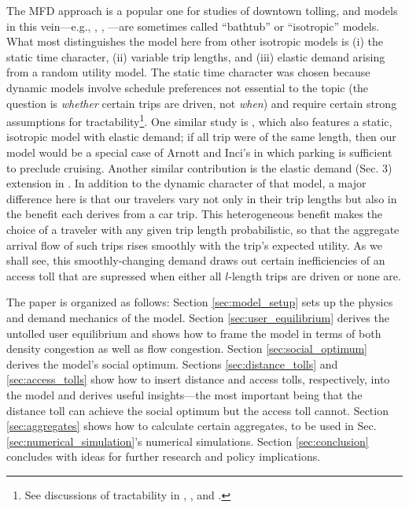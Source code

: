 \documentclass[preprint,authoryear]{elsarticle}
\begin{document}
The MFD approach is a popular one for studies of downtown tolling, and models in this vein---e.g., \citet{SmallChu2003}, \citet{Arnott2013}, \citet{Geroliminis2009a}---are sometimes called ``bathtub'' or ``isotropic'' models. What most distinguishes the model here from other isotropic models is (i) the static time character, (ii) variable trip lengths, and (iii) elastic demand arising from a random utility model. The static time character was chosen because dynamic models involve schedule preferences not essential to the topic (the question is \emph{whether} certain trips are driven, not \emph{when}) and require certain strong assumptions for tractability\footnote{See discussions of tractability in \citet{Fosgerau2015}, \citet{Daganzo2015}, \citet{Arnott2016} and \citet{Mariotte2017}.}. One similar study is \citet{Arnott2010}, which also features a static, isotropic model with elastic demand; if all trip were of the same length, then our model would be a special case of Arnott and Inci's in which parking is sufficient to preclude cruising. Another similar contribution is the elastic demand (Sec. 3) extension in \citet{Fosgerau2015}. In addition to the dynamic character of that model, a major difference here is that our travelers vary not only in their trip lengths but also in the benefit each derives from a car trip. This heterogeneous benefit makes the choice of a traveler with any given trip length probabilistic, so that the aggregate arrival flow of such trips rises smoothly with the trip's expected utility. As we shall see, this smoothly-changing demand draws out certain inefficiencies of an access toll that are supressed when either all $l$-length trips are driven or none are.

The paper is organized as follows: Section \ref{sec:model_setup} sets up the physics and demand mechanics of the model. Section \ref{sec:user_equilibrium} derives the untolled user equilibrium and shows how to frame the model in terms of both density congestion as well as flow congestion. Section \ref{sec:social_optimum} derives the model's social optimum. Sections \ref{sec:distance_tolls} and \ref{sec:access_tolls} show how to insert distance and access tolls, respectively, into the model and derives useful insights---the most important being that the distance toll can achieve the social optimum but the access toll cannot. Section \ref{sec:aggregates} shows how to calculate certain aggregates, to be used in Sec. \ref{sec:numerical_simulation}'s numerical simulations. Section \ref{sec:conclusion} concludes with ideas for further research and policy implications.
\end{document}
